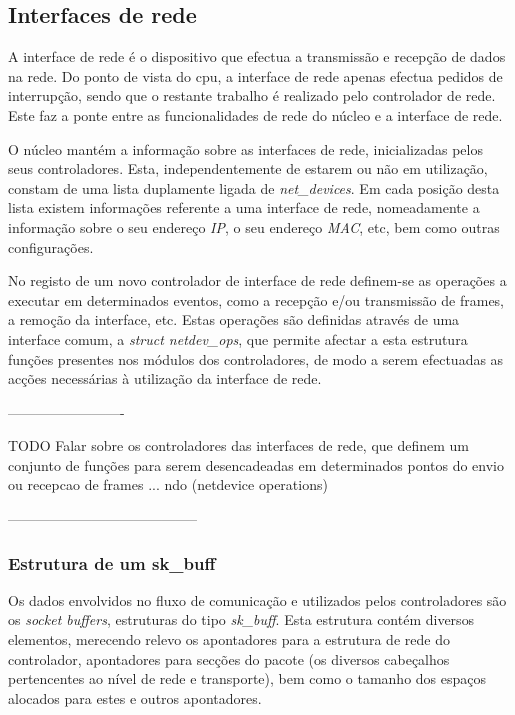 \subsection{Interfaces de rede}

A interface de rede é o dispositivo que efectua a transmissão e recepção de dados na rede.
Do ponto de vista do cpu, a interface de rede apenas efectua pedidos de interrupção, sendo que o restante trabalho é realizado pelo controlador de rede.
Este faz a ponte entre as funcionalidades de rede do núcleo e a interface de rede.

O núcleo mantém a informação sobre as interfaces de rede, inicializadas pelos seus controladores.
Esta, independentemente de estarem ou não em utilização, constam de uma lista duplamente ligada de \textit{net\_devices}.
Em cada posição desta lista existem informações referente a uma interface de rede, nomeadamente a informação sobre o seu endereço \textit{IP}, o seu endereço \textit{MAC}, etc, bem como outras configurações.

No registo de um novo controlador de interface de rede definem-se as operações a executar em determinados eventos, como a recepção e/ou transmissão de frames, a remoção da interface, etc.
Estas operações são definidas através de uma interface comum, a \textit{struct netdev\_ops}, que permite afectar a esta estrutura funções presentes nos módulos dos controladores, de modo a serem efectuadas as acções necessárias à utilização da interface de rede.

-------------------------

TODO
Falar sobre os controladores das interfaces de rede, que definem um conjunto de funções para serem desencadeadas em determinados pontos do envio ou recepcao de frames ... ndo (netdevice operations) 
 
-----------------------------------------

\subsubsection{Estrutura de um sk\_buff}
\label{subsub:sk_buff}

Os dados envolvidos no fluxo de comunicação e utilizados pelos controladores são os \textit{socket buffers}, estruturas do tipo \textit{sk\_buff}.
Esta estrutura contém diversos elementos, merecendo relevo os apontadores para a estrutura de rede do controlador, apontadores para secções do pacote (os diversos cabeçalhos pertencentes ao nível de rede e transporte), bem como o tamanho dos espaços alocados para estes e outros apontadores.

